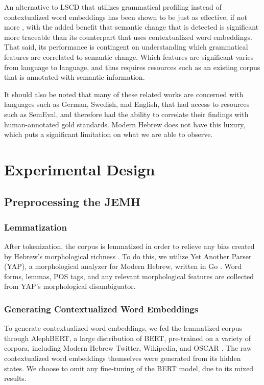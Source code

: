 \documentclass[10pt, a4paper]{article}
\begin{document}
An alternative to LSCD that utilizes grammatical profiling instead of contextualized word embeddings has been shown to be just as effective, if not more \cite{grammaticalprofiling}, with the added benefit that semantic change that is detected is significant more traceable than its counterpart that uses contextualized word embeddings. That said, its performance is contingent on understanding which grammatical features are correlated to semantic change. Which features are significant varies from language to language, and thus requires resources such as an existing corpus that is annotated with semantic information.

It should also be noted that many of these related works are concerned with languages such as German, Swedish, and English, that had access to resources such as SemEval, and therefore had the ability to correlate their findings with human-annotated gold standards. Modern Hebrew does not have this luxury, which puts a significant limitation on what we are able to observe.
\section{Experimental Design}

\subsection{Preprocessing the JEMH}

\subsubsection{Lemmatization}
After tokenization, the corpus is lemmatized in order to relieve any bias created by Hebrew's morphological richness \cite{Laicher2021}. To do this, we utilize Yet Another Parser (YAP), a morphological analyzer for Modern Hebrew, written in Go \cite{yap}. Word forms, lemmas, POS tags, and any relevant morphological features are collected from YAP's morphological disambiguator. 
\subsubsection{Generating Contextualized Word Embeddings}
To generate contextualized word embeddings, we fed the lemmatized corpus through AlephBERT, a large distribution of BERT, pre-trained on a variety of corpora, including Modern Hebrew Twitter, Wikipedia, and OSCAR \cite{alephBERT}. The raw contextualized word embeddings themselves were generated from its hidden states. We choose to omit any fine-tuning of the BERT model, due to its mixed results.
\end{document}

